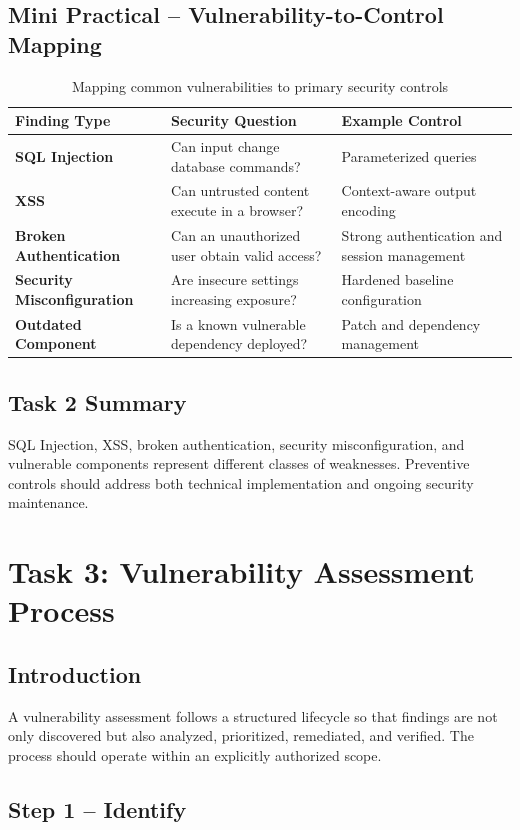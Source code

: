 \documentclass[11pt,a4paper]{article}
\begin{document}
\subsection{Mini Practical – Vulnerability-to-Control Mapping}
\begin{table}[H]\centering
\small
\begin{tabularx}{\textwidth}{>{\bfseries}p{3.0cm}X X}
\toprule
Finding Type & Security Question & Example Control\\
\midrule
SQL Injection & Can input change database commands? & Parameterized queries\\
XSS & Can untrusted content execute in a browser? & Context-aware output encoding\\
Broken Authentication & Can an unauthorized user obtain valid access? & Strong authentication and session management\\
Security Misconfiguration & Are insecure settings increasing exposure? & Hardened baseline configuration\\
Outdated Component & Is a known vulnerable dependency deployed? & Patch and dependency management\\
\bottomrule
\end{tabularx}
\caption{Mapping common vulnerabilities to primary security controls}
\end{table}

\subsection{Task 2 Summary}
SQL Injection, XSS, broken authentication, security misconfiguration, and vulnerable components represent different classes of weaknesses. Preventive controls should address both technical implementation and ongoing security maintenance.

\newpage
\section{Task 3: Vulnerability Assessment Process}

\subsection{Introduction}
A vulnerability assessment follows a structured lifecycle so that findings are not only discovered but also analyzed, prioritized, remediated, and verified. The process should operate within an explicitly authorized scope.


\subsection{Step 1 – Identify}
\end{document}
